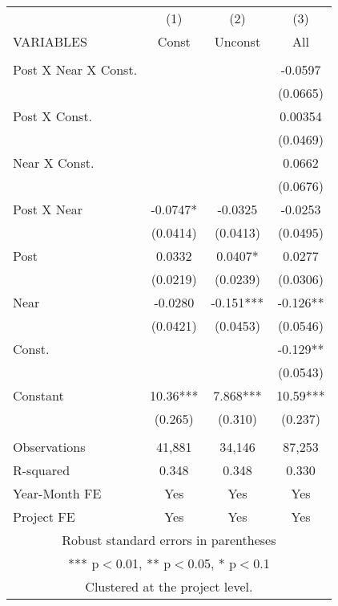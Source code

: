 \begin{tabular}{lccc} \hline
 & (1) & (2) & (3) \\
VARIABLES & Const & Unconst & All \\ \hline
 &  &  &  \\
Post X Near X Const. &  &  & -0.0597 \\
 &  &  & (0.0665) \\
Post X Const. &  &  & 0.00354 \\
 &  &  & (0.0469) \\
Near X Const. &  &  & 0.0662 \\
 &  &  & (0.0676) \\
Post X Near & -0.0747* & -0.0325 & -0.0253 \\
 & (0.0414) & (0.0413) & (0.0495) \\
Post & 0.0332 & 0.0407* & 0.0277 \\
 & (0.0219) & (0.0239) & (0.0306) \\
Near & -0.0280 & -0.151*** & -0.126** \\
 & (0.0421) & (0.0453) & (0.0546) \\
Const. &  &  & -0.129** \\
 &  &  & (0.0543) \\
Constant & 10.36*** & 7.868*** & 10.59*** \\
 & (0.265) & (0.310) & (0.237) \\
 &  &  &  \\
Observations & 41,881 & 34,146 & 87,253 \\
R-squared & 0.348 & 0.348 & 0.330 \\
Year-Month FE & Yes & Yes & Yes \\
 Project FE & Yes & Yes & Yes \\ \hline
\multicolumn{4}{c}{ Robust standard errors in parentheses} \\
\multicolumn{4}{c}{ *** p$<$0.01, ** p$<$0.05, * p$<$0.1} \\
\multicolumn{4}{c}{ Clustered at the project level.} \\
\end{tabular}
